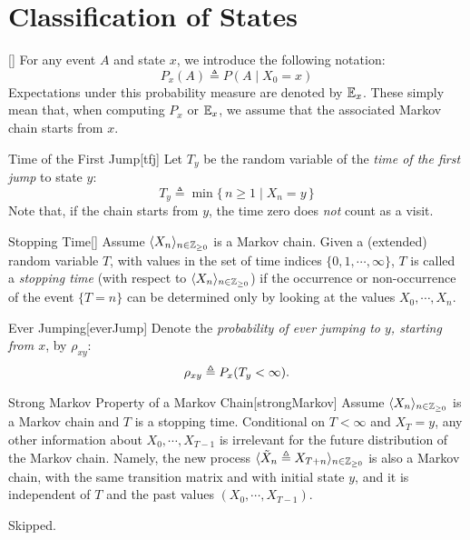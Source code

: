 \documentclass[../probability.tex]{subfiles}
\begin{document}
\section{Classification of States}

\begin{Notation}{}[]
    For any event \(A\) and state \(x\), we introduce the following notation:
    \[
        P_x(A) \triangleq P(A \mid X_0 = x)
    \]
    Expectations under this probability measure are denoted by \(\mathbb{E}_x\).
    These simply mean that, when computing \(P_x\) or \(\mathbb{E}_x\), we assume that
    the associated Markov chain starts from \(x\).
\end{Notation}

\begin{Definition}{Time of the First Jump}[tfj]
    Let \(T_y\) be the random variable of the \emph{time of the first jump} to state \(y\):
    \[
        T_y \triangleq \min \{\,n \ge 1 \mid X_n = y\,\}
    \]
    Note that, if the chain starts from \(y\), the time zero does \emph{not} count as a visit.
\end{Definition}

\begin{Definition}{Stopping Time}[]
    Assume \(\lang X_n \rang_{n \in \ZZ_{\ge 0}}\) is a Markov chain.
    Given a (extended) random variable \(T\), with values in the set of time indices \(\{0,1,\cdots,\infty\}\),
    \(T\) is called a \emph{stopping time} (with respect to \(\lang X_n \rang_{n \in \ZZ_{\ge 0}}\))
    if the occurrence or non-occurrence of the event \(\{T = n\}\) can be determined
    only by looking at the values \(X_0, \cdots, X_n\).
\end{Definition}

\begin{Definition}{Ever Jumping}[everJump]
    Denote the \emph{probability of ever jumping to \(y\), starting from \(x\)}, by \(\rho_{xy}\):
    \[
        \rho_{xy} \triangleq P_x(T_y < \infty)\text.
    \]
\end{Definition}

\begin{Theorem}{Strong Markov Property of a Markov Chain}[strongMarkov]
    Assume \(\lang X_n \rang_{n \in \ZZ_{\ge 0}}\) is a Markov chain and \(T\)
    is a stopping time. Conditional on \(T < \infty\) and \(X_T = y\),
    any other information about \(X_0, \cdots, X_{T-1}\) is irrelevant for the future
    distribution of the Markov chain.
    Namely, the new process \(\lang \tilde{X}_n \triangleq X_{T+n} \rang_{n \in \ZZ_{\ge 0}}\)
    is also a Markov chain, with the same transition matrix and with initial state \(y\),
    and it is independent of \(T\) and the past values \((X_0, \cdots, X_{T-1})\).
\end{Theorem}
\begin{myproof}[Proof]
    Skipped.
\end{myproof}
\end{document}
